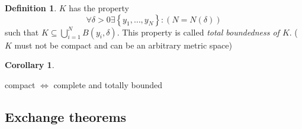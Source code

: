 \documentclass[a4paper,landscape,twocolumn]{article}
\theoremstyle{definition}
\newtheorem{defi}{Definition}
\newtheorem{cor}{Corollary}
\newcommand\set[1]{\left\{#1\right\}}
\begin{document}
\begin{defi}
  $K$ has the property
  \[ \forall \delta > 0 \exists \set{y_1, \ldots, y_N}: (N = N(\delta)) \]
  such that $K \subseteq \bigcup_{i=1}^N B(y_i, \delta)$.
  This property is called \emph{total boundedness of $K$}.
  ($K$ must not be compact and can be an arbitrary metric space)
\end{defi}

\begin{cor}
  \begin{center} compact $\iff$ complete and totally bounded \end{center}
\end{cor}

\subsection{Exchange theorems}
\end{document}
